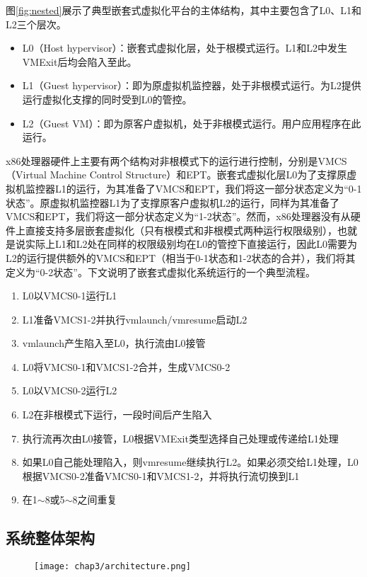 图\ref{fig:nested}展示了典型嵌套式虚拟化平台的主体结构，其中主要包含了L0、L1和L2三个层次。

\begin{itemize}
\item{L0（Host hypervisor）：嵌套式虚拟化层，处于根模式运行。L1和L2中发生VMExit后均会陷入至此。}
\item{L1（Guest hypervisor）：即为原虚拟机监控器，处于非根模式运行。为L2提供运行虚拟化支撑的同时受到L0的管控。}
\item{L2（Guest VM）：即为原客户虚拟机，处于非根模式运行。用户应用程序在此运行。}
\end{itemize}

x86处理器硬件上主要有两个结构对非根模式下的运行进行控制，分别是VMCS（Virtual Machine Control Structure）和EPT。嵌套式虚拟化层L0为了支撑原虚拟机监控器L1的运行，为其准备了VMCS和EPT，我们将这一部分状态定义为“0-1状态”。原虚拟机监控器L1为了支撑原客户虚拟机L2的运行，同样为其准备了VMCS和EPT，我们将这一部分状态定义为“1-2状态”。然而，x86处理器没有从硬件上直接支持多层嵌套虚拟化（只有根模式和非根模式两种运行权限级别），也就是说实际上L1和L2处在同样的权限级别均在L0的管控下直接运行，因此L0需要为L2的运行提供额外的VMCS和EPT（相当于0-1状态和1-2状态的合并），我们将其定义为“0-2状态”。下文说明了嵌套式虚拟化系统运行的一个典型流程。

\begin{enumerate}
\item L0以VMCS0-1运行L1
\item L1准备VMCS1-2并执行vmlaunch/vmresume启动L2
\item vmlaunch产生陷入至L0，执行流由L0接管
\item L0将VMCS0-1和VMCS1-2合并，生成VMCS0-2
\item L0以VMCS0-2运行L2
\item L2在非根模式下运行，一段时间后产生陷入
\item 执行流再次由L0接管，L0根据VMExit类型选择自己处理或传递给L1处理
\item 如果L0自己能处理陷入，则vmresume继续执行L2。如果必须交给L1处理，L0根据VMCS0-2准备VMCS0-1和VMCS1-2，并将执行流切换到L1
\item 在1$\sim$8或5$\sim$8之间重复
\end{enumerate}

\subsection{系统整体架构}

\begin{figure}[!htp]
  \centering
  \texttt{[image: chap3/architecture.png]}
\end{figure}

